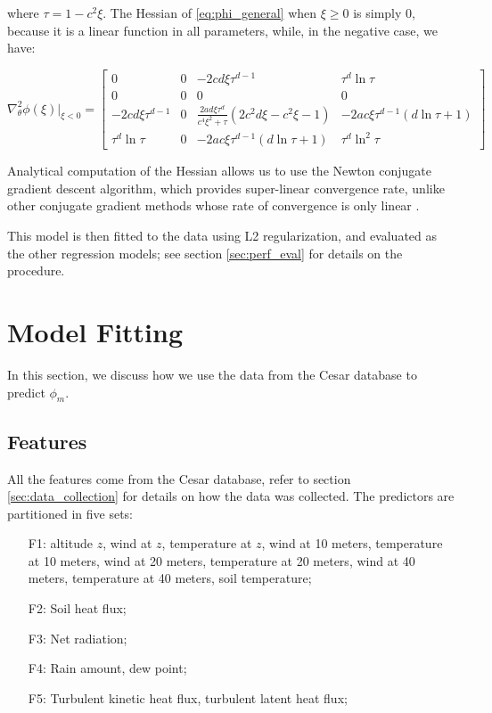 \documentclass[12pt]{book}
\begin{document}
where $\tau=1-c^2\xi$. The Hessian of \ref{eq:phi_general} when $\xi\geq 0$ is simply 0, because it is a linear function in all parameters, while, in the negative case, we have:

\begin{equation}
\nabla^2_\theta\phi(\xi)\vert_{\xi<0} = \begin{bmatrix}
0 & 0 & - 2 c d \xi \tau^{d - 1} & \tau^{d} \ln{\tau} \\
0 & 0 & 0 & 0 \\
- 2 c d \xi \tau^{d - 1} &
0 & \frac{2ad\xi\tau^{d}}{c^4\xi^2+\tau}\left(2c^2d\xi-c^2\xi-1\right) & -2ac\xi\tau^{d-1}\left(d\ln\tau+1\right) \\
\tau^d \ln\tau & 0 &
-2ac\xi\tau^{d-1}\left(d\ln\tau+1\right) &
\tau^d\ln^2\tau
\end{bmatrix}
\end{equation}

Analytical computation of the Hessian allows us to use the Newton conjugate gradient descent algorithm, which provides super-linear convergence rate, unlike other conjugate gradient methods whose rate of convergence is only linear \citep{numopt}.

This model is then fitted to the data using L2 regularization, and evaluated as the other regression models; see section \ref{sec:perf_eval} for details on the procedure.

\section{Model Fitting}
\label{sec:model_fit}
In this section, we discuss how we use the data from the Cesar database to predict $\phi_m$.

\subsection{Features}
All the features come from the Cesar database, refer to section \ref{sec:data_collection} for details on how the data was collected. The predictors are partitioned in five sets:

\begin{enumerate}
\item[F1:] altitude $z$, wind at $z$, temperature at $z$, wind at 10 meters, temperature at 10 meters, wind at 20 meters, temperature at 20 meters, wind at 40 meters, temperature at 40 meters, soil temperature;
\item[F2:] Soil heat flux;
\item[F3:] Net radiation;
\item[F4:] Rain amount, dew point;
\item[F5:] Turbulent kinetic heat flux, turbulent latent heat flux;
\end{enumerate}
\end{document}
